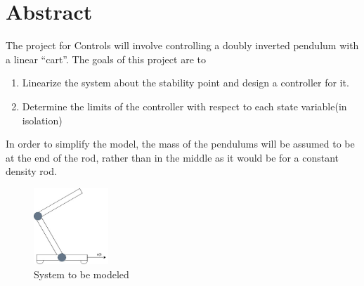 \section{Abstract}

The project for Controls will involve controlling a doubly inverted pendulum with a linear ``cart''. The goals
of this project are to
\begin{enumerate}
\item Linearize the system about the stability point and design a controller for it.
\item Determine the limits of the controller with respect to each state variable(in isolation) 
\end{enumerate}

In order to simplify the model, the mass of the pendulums will be assumed to be at the end of the rod, rather
than in the middle as it would be for a constant density rod.

\begin{figure}[h]
  \centering
  \includegraphics[width=0.25\textwidth]{../resources/doublyInvertedPendulum.jpg}
  \caption{System to be modeled}
  \label{}
\end{figure}
